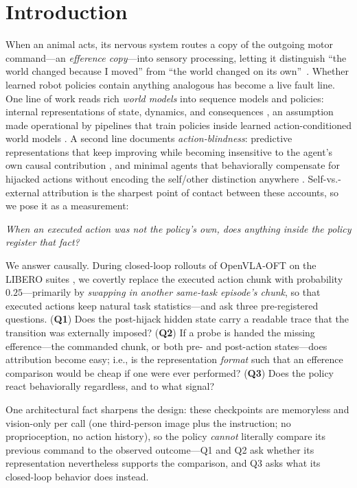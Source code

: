 \documentclass{article}
\begin{document}
\section{Introduction}
\label{sec:intro}

When an animal acts, its nervous system routes a copy of the outgoing motor
command---an \emph{efference copy}---into sensory processing, letting it
distinguish ``the world changed because I moved'' from ``the world changed on
its own''~\citep{vonholst1950,sperry1950,crapse2008}. Whether learned robot
policies contain anything analogous has become a live fault line. One line of
work reads rich \emph{world models} into sequence models and policies:
internal representations of state, dynamics, and consequences
\citep{ha2018world,hafner2020dream,li2023othello,gurnee2024language}, an
assumption made operational by pipelines that train policies inside learned
action-conditioned world models \citep{zhu2025wmpo}. A second line documents
\emph{action-blindness}: predictive representations that keep improving while
becoming insensitive to the agent's own causal contribution
\citep{li2026dueling}, and minimal agents that behaviorally compensate for
hijacked actions without encoding the self/other distinction anywhere
\citep{ye2026prediction}. Self-vs.-external attribution is the sharpest point
of contact between these accounts, so we pose it as a measurement:

\begin{center}
\emph{When an executed action was not the policy's own, does anything
inside the policy register that fact?}
\end{center}

We answer causally. During closed-loop rollouts of OpenVLA-OFT
\citep{kim2025oft} on the LIBERO suites \citep{liu2023libero}, we covertly
replace the executed action chunk with probability $0.25$---primarily by
\emph{swapping in another same-task episode's chunk}, so that executed
actions keep natural task statistics---and ask three pre-registered
questions. (\textbf{Q1}) Does the post-hijack hidden state carry a readable
trace that the transition was externally imposed? (\textbf{Q2}) If a probe
is handed the missing efference---the commanded chunk, or both pre- and
post-action states---does attribution become easy; i.e., is the
representation \emph{format} such that an efference comparison would be
cheap if one were ever performed? (\textbf{Q3}) Does the policy react
behaviorally regardless, and to what signal?

One architectural fact sharpens the design: these checkpoints are memoryless
and vision-only per call (one third-person image plus the instruction; no
proprioception, no action history), so the policy \emph{cannot} literally
compare its previous command to the observed outcome---Q1 and Q2 ask whether
its representation nevertheless supports the comparison, and Q3 asks what
its closed-loop behavior does instead.
\end{document}

